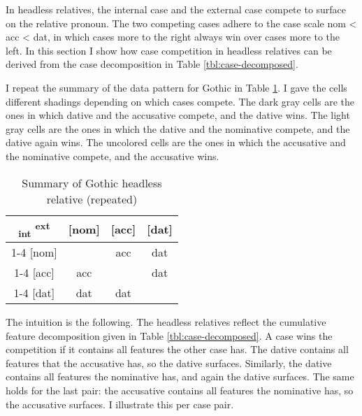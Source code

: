 In headless relatives, the internal case and the external case compete to surface on the relative pronoun. The two competing cases adhere to the case scale \ac{nom} < \ac{acc} < \ac{dat}, in which cases more to the right always win over cases more to the left. In this section I show how case competition in headless relatives can be derived from the case decomposition in Table \ref{tbl:case-decomposed}.

I repeat the summary of the data pattern for Gothic in Table \ref{tbl:summary-gothic-deriving}. I gave the cells different shadings depending on which cases compete. The dark gray cells are the ones in which dative and the accusative compete, and the dative wins. The light gray cells are the ones in which the dative and the nominative compete, and the dative again wins. The uncolored cells are the ones in which the accusative and the nominative compete, and the accusative wins.

\begin{table}[H]
  \center
  \caption {Summary of Gothic headless relative (repeated)}
  \begin{tabular}{c|c|c|c}
    \toprule
        \textsubscript{\ac{int}} \textsuperscript{\ac{ext}}
          & [\ac{nom}]
          & [\ac{acc}]
          & [\ac{dat}]
          \\ \cmidrule{1-4}
      [\ac{nom}]
          &
          & \ac{acc}
          & \cellcolor{LG}\ac{dat}
          \\ \cmidrule{1-4}
      [\ac{acc}]
          & \ac{acc}
          &
          & \cellcolor{DG}\ac{dat}
          \\ \cmidrule{1-4}
      [\ac{dat}]
          & \cellcolor{LG}\ac{dat}
          & \cellcolor{DG}\ac{dat}
          &
          \\
    \bottomrule
  \end{tabular}
    \label{tbl:summary-gothic-deriving}
\end{table}

The intuition is the following. The headless relatives reflect the cumulative feature decomposition given in Table \ref{tbl:case-decomposed}. A case wins the competition if it contains all features the other case has. The dative contains all features that the accusative has, so the dative surfaces. Similarly, the dative contains all features the nominative has, and again the dative surfaces. The same holds for the last pair: the accusative contains all features the nominative has, so the accusative surfaces. I illustrate this per case pair.

